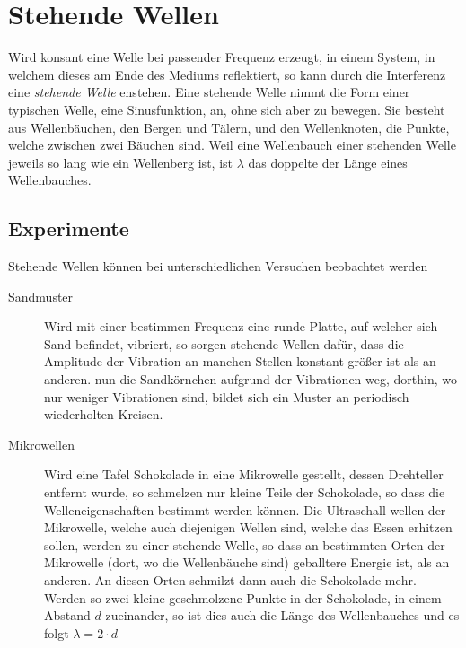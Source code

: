 \documentclass{article}
\begin{document}
\section{Stehende Wellen} 
Wird konsant eine Welle bei passender Frequenz erzeugt, in einem System, in welchem dieses am Ende des Mediums reflektiert, so kann durch die Interferenz eine \emph{stehende Welle} enstehen. Eine stehende Welle nimmt die Form einer typischen Welle, eine Sinusfunktion, an, ohne sich aber zu bewegen.
Sie besteht aus Wellenbäuchen, den Bergen und Tälern, und den Wellenknoten, die Punkte, welche zwischen zwei Bäuchen sind. Weil eine Wellenbauch einer stehenden Welle jeweils so lang wie ein Wellenberg ist, ist $\lambda$ das doppelte der Länge eines Wellenbauches.  
 
\subsection{Experimente}
Stehende Wellen können bei unterschiedlichen Versuchen beobachtet werden
\begin{description}
 \item[Sandmuster] Wird mit einer bestimmen Frequenz eine runde Platte, auf welcher sich Sand befindet, vibriert, so sorgen stehende Wellen dafür, dass die Amplitude der Vibration an manchen Stellen konstant größer ist als an anderen.  nun die Sandkörnchen aufgrund der Vibrationen weg, dorthin, wo nur weniger Vibrationen sind, bildet sich ein Muster an periodisch wiederholten Kreisen.
 \item[Mikrowellen] Wird eine Tafel Schokolade in eine Mikrowelle gestellt, dessen Drehteller entfernt wurde, so schmelzen nur kleine Teile der Schokolade, so dass die Welleneigenschaften bestimmt werden können. Die Ultraschall wellen der Mikrowelle, welche auch diejenigen Wellen sind, welche das Essen erhitzen sollen, werden zu einer stehende Welle, so dass an bestimmten Orten der Mikrowelle (dort, wo die Wellenbäuche sind) geballtere Energie ist, als an anderen. An diesen Orten schmilzt dann auch die Schokolade mehr. \newline 
Werden so zwei kleine geschmolzene Punkte in der Schokolade, in einem Abstand $d$ zueinander, so ist dies auch die Länge des Wellenbauches und es folgt $\lambda = 2 \cdot d$ 
\end{description} 
\end{document}
